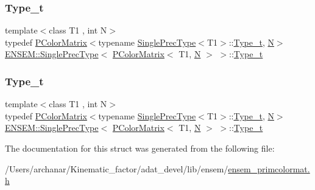 \subsubsection{\texorpdfstring{Type\_t}{Type\_t}\hspace{0.1cm}{\footnotesize\ttfamily [1/2]}}
{\footnotesize\ttfamily template$<$class T1 , int N$>$ \\
typedef \mbox{\hyperlink{classENSEM_1_1PColorMatrix}{P\+Color\+Matrix}}$<$typename \mbox{\hyperlink{structENSEM_1_1SinglePrecType}{Single\+Prec\+Type}}$<$T1$>$\+::\mbox{\hyperlink{structENSEM_1_1SinglePrecType_3_01PColorMatrix_3_01T1_00_01N_01_4_01_4_a75f8a27b94fdcd735897c0556a26c7e3}{Type\+\_\+t}}, \mbox{\hyperlink{operator__name__util_8cc_a7722c8ecbb62d99aee7ce68b1752f337}{N}}$>$ \mbox{\hyperlink{structENSEM_1_1SinglePrecType}{E\+N\+S\+E\+M\+::\+Single\+Prec\+Type}}$<$ \mbox{\hyperlink{classENSEM_1_1PColorMatrix}{P\+Color\+Matrix}}$<$ T1, \mbox{\hyperlink{operator__name__util_8cc_a7722c8ecbb62d99aee7ce68b1752f337}{N}} $>$ $>$\+::\mbox{\hyperlink{structENSEM_1_1SinglePrecType_3_01PColorMatrix_3_01T1_00_01N_01_4_01_4_a75f8a27b94fdcd735897c0556a26c7e3}{Type\+\_\+t}}}

\mbox{\label{structENSEM_1_1SinglePrecType_3_01PColorMatrix_3_01T1_00_01N_01_4_01_4_a75f8a27b94fdcd735897c0556a26c7e3}} 
\subsubsection{\texorpdfstring{Type\_t}{Type\_t}\hspace{0.1cm}{\footnotesize\ttfamily [2/2]}}
{\footnotesize\ttfamily template$<$class T1 , int N$>$ \\
typedef \mbox{\hyperlink{classENSEM_1_1PColorMatrix}{P\+Color\+Matrix}}$<$typename \mbox{\hyperlink{structENSEM_1_1SinglePrecType}{Single\+Prec\+Type}}$<$T1$>$\+::\mbox{\hyperlink{structENSEM_1_1SinglePrecType_3_01PColorMatrix_3_01T1_00_01N_01_4_01_4_a75f8a27b94fdcd735897c0556a26c7e3}{Type\+\_\+t}}, \mbox{\hyperlink{operator__name__util_8cc_a7722c8ecbb62d99aee7ce68b1752f337}{N}}$>$ \mbox{\hyperlink{structENSEM_1_1SinglePrecType}{E\+N\+S\+E\+M\+::\+Single\+Prec\+Type}}$<$ \mbox{\hyperlink{classENSEM_1_1PColorMatrix}{P\+Color\+Matrix}}$<$ T1, \mbox{\hyperlink{operator__name__util_8cc_a7722c8ecbb62d99aee7ce68b1752f337}{N}} $>$ $>$\+::\mbox{\hyperlink{structENSEM_1_1SinglePrecType_3_01PColorMatrix_3_01T1_00_01N_01_4_01_4_a75f8a27b94fdcd735897c0556a26c7e3}{Type\+\_\+t}}}



The documentation for this struct was generated from the following file\+:\begin{DoxyCompactItemize}
\item 
/\+Users/archanar/\+Kinematic\+\_\+factor/adat\+\_\+devel/lib/ensem/\mbox{\hyperlink{lib_2ensem_2ensem__primcolormat_8h}{ensem\+\_\+primcolormat.\+h}}\end{DoxyCompactItemize}
